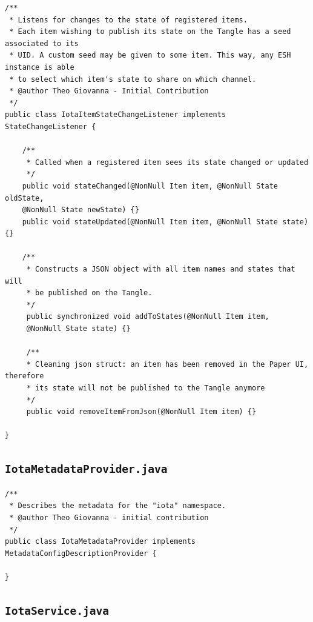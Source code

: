 \documentclass[a4paper,10pt]{article}
\begin{document}
\begin{verbatim}
/**
 * Listens for changes to the state of registered items.
 * Each item wishing to publish its state on the Tangle has a seed associated to its 
 * UID. A custom seed may be given to some item. This way, any ESH instance is able 
 * to select which item's state to share on which channel.
 * @author Theo Giovanna - Initial Contribution
 */
public class IotaItemStateChangeListener implements StateChangeListener {

	/**
	 * Called when a registered item sees its state changed or updated
	 */ 
	public void stateChanged(@NonNull Item item, @NonNull State oldState, 
	@NonNull State newState) {}
	public void stateUpdated(@NonNull Item item, @NonNull State state) {}
	
	/**
	 * Constructs a JSON object with all item names and states that will
	 * be published on the Tangle.
	 */
	 public synchronized void addToStates(@NonNull Item item, 
	 @NonNull State state) {}
	 
	 /**
	 * Cleaning json struct: an item has been removed in the Paper UI, therefore 
	 * its state will not be published to the Tangle anymore
	 */
	 public void removeItemFromJson(@NonNull Item item) {}

}
\end{verbatim}

\subsection{\texttt{IotaMetadataProvider.java}}

\begin{verbatim}
/**
 * Describes the metadata for the "iota" namespace.
 * @author Theo Giovanna - initial contribution
 */
public class IotaMetadataProvider implements MetadataConfigDescriptionProvider {

}

\end{verbatim}

\newpage

\subsection{\texttt{IotaService.java}}
\end{document}
